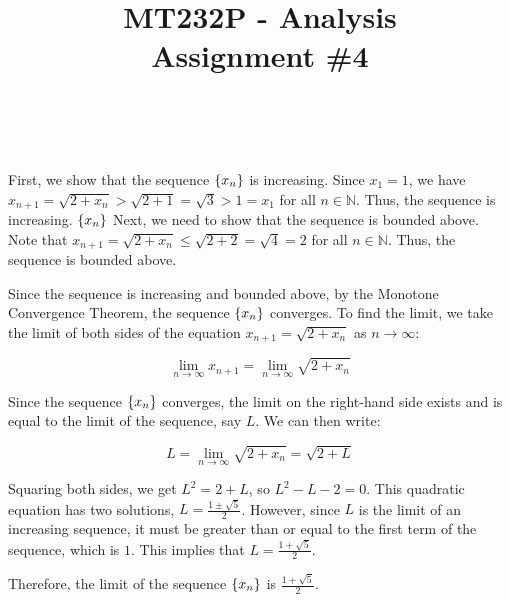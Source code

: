 \documentclass{article}
\title{
    \vspace{2in}
        \textmd{\textbf{MT232P - Analysis}}\\
    \vspace{1in}
    \textmd{\textbf{Assignment \#4}}\\
    \vspace{1in}
}
\author{
    \hmwkAuthorName\\
    \hmwkStudentnum
}
\date{}
\begin{document}
\maketitle

\pagebreak

\begin{homeworkProblem}
    \solution
    First, we show that the sequence $\left\{x_n\right\}$ is increasing. Since $x_1 = 1$, we have $x_{n+1} = \sqrt{2+x_n} > \sqrt{2+1} = \sqrt{3} > 1 = x_1$ for all $n \in \mathbb{N}$. Thus, the sequence is increasing.
    $\left\{x_n\right\}$
    Next, we need to show that the sequence is bounded above. Note that $x_{n+1} = \sqrt{2+x_n} \le \sqrt{2+2} = \sqrt{4} = 2$ for all $n \in \mathbb{N}$. Thus, the sequence is bounded above.

    Since the sequence is increasing and bounded above, by the Monotone Convergence Theorem, the sequence $\left\{x_n\right\}$ converges. To find the limit, we take the limit of both sides of the equation $x_{n+1} = \sqrt{2+x_n}$ as $n \to \infty$:

    $$\lim_{n \to \infty} x_{n+1} = \lim_{n \to \infty} \sqrt{2+x_n}$$

    Since the sequence $\left\{x_n\right\}$ converges, the limit on the right-hand side exists and is equal to the limit of the sequence, say $L$. We can then write:

    $$L = \lim_{n \to \infty} \sqrt{2+x_n} = \sqrt{2+L}$$

    Squaring both sides, we get $L^2 = 2 + L$, so $L^2 - L - 2 = 0$. This quadratic equation has two solutions, $L = \frac{1 \pm \sqrt{5}}{2}$. However, since $L$ is the limit of an increasing sequence, it must be greater than or equal to the first term of the sequence, which is $1$. This implies that $L = \frac{1 + \sqrt{5}}{2}$.

    Therefore, the limit of the sequence $\left\{x_n\right\}$ is $\frac{1 + \sqrt{5}}{2}$.
\end{homeworkProblem}
\begin{homeworkProblem}
    \solution
\end{homeworkProblem}
\begin{homeworkProblem}
    \solution
\end{homeworkProblem}
\begin{homeworkProblem}
    \solution
    
\end{homeworkProblem}
\end{document}
